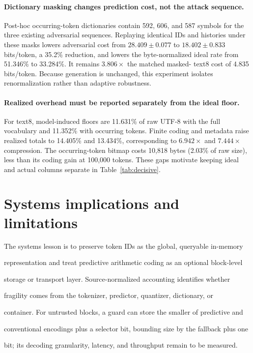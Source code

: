 \documentclass{article}
\begin{document}
\paragraph{Dictionary masking changes prediction cost, not the attack sequence.}
Post-hoc occurring-token dictionaries contain 592, 606, and 587 symbols for the
three existing adversarial sequences. Replaying identical IDs and histories under
these masks lowers adversarial cost from $28.409\pm0.077$ to
$18.402\pm0.833$ bits/token, a 35.2\% reduction, and lowers the byte-normalized
ideal rate from 51.346\% to 33.284\%. It remains $3.806\times$ the matched masked-
text8 cost of 4.835 bits/token. Because generation is unchanged, this experiment
isolates renormalization rather than adaptive robustness.

\paragraph{Realized overhead must be reported separately from the ideal floor.}
For text8, model-induced floors are 11.631\% of raw UTF-8 with the full vocabulary
and 11.352\% with occurring tokens. Finite coding and metadata raise realized totals
to 14.405\% and 13.434\%, corresponding to $6.942\times$ and $7.444\times$
compression. The occurring-token bitmap costs 10,818 bytes (2.03\% of raw size),
less than its coding gain at 100,000 tokens. These gaps motivate keeping ideal and
actual columns separate in Table~\ref{tab:decisive}.

\section{Systems implications and limitations}

\label{sec\:limitations}

The systems lesson is to preserve token IDs as the global, queryable in-memory

representation and treat predictive arithmetic coding as an optional block-level

storage or transport layer. Source-normalized accounting identifies whether

fragility comes from the tokenizer, predictor, quantizer, dictionary, or

container. For untrusted blocks, a guard can store the smaller of predictive and

conventional encodings plus a selector bit, bounding size by the fallback plus one

bit; its decoding granularity, latency, and throughput remain to be measured.
\end{document}
